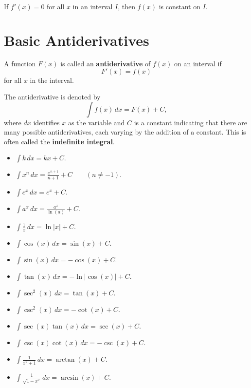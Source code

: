 \documentclass{ximera}
\renewcommand{\d}{\,d}
\begin{document}
\begin{theorem}
If $f'(x)=0$ for all $x$ in an interval $I$, then $f(x)$ is constant
on $I$.
\end{theorem}






\section{Basic Antiderivatives}







\begin{definition}
A function $F(x)$ is called an \textbf{antiderivative} of $f(x)$ on an
interval if
\[
F'(x) = f(x)
\]
for all $x$ in the interval.
\end{definition}




\begin{definition}
The antiderivative is denoted by
\[
\int f(x) \d x = F(x)+C,
\]
where $dx$ identifies $x$ as the variable and $C$ is a constant
indicating that there are many possible antiderivatives, each varying by
the addition of a constant. This is often called the
\textbf{indefinite integral}.
\end{definition}



\begin{theorem}\label{theorem:basicAnti} \hfil
\begin{multicols}{3}
\begin{itemize}
\item $\int k \d x= kx+C$.
\item $\int x^n \d x= \frac{x^{n+1}}{n+1}+C\qquad(n\ne-1)$.
\item $\int e^x \d x= e^x + C$.
\item $\int a^x \d x= \frac{a^x}{\ln(a)}+C$.
\item $\int \frac{1}{x} \d x= \ln|x|+C$.
\item $\int \cos(x) \d x = \sin(x) + C$.
\item $\int \sin(x) \d x = -\cos(x) + C$.
\item $\int \tan(x) \d x = -\ln|\cos(x)| + C$.
\item $\int \sec^2(x) \d x = \tan(x) + C$.
\item $\int \csc^2(x) \d x = -\cot(x) + C$.
\item $\int \sec(x)\tan(x) \d x = \sec(x) + C$.
\item $\int \csc(x)\cot(x) \d x = -\csc(x) + C$.
\item $\int \frac{1}{x^2+1}\d x = \arctan(x) + C$.
\item $\int \frac{1}{\sqrt{1-x^2}}\d x= \arcsin(x)+C$.
\end{itemize}
\end{multicols}
\end{theorem}
\end{document}
